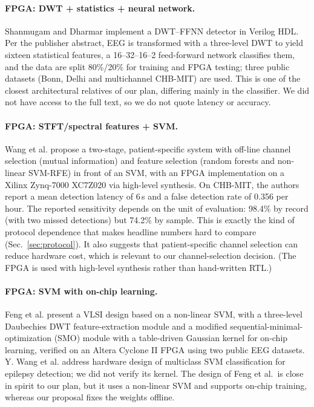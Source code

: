 \documentclass[10pt,twocolumn,letterpaper]{article}
\begin{document}
\paragraph{FPGA: DWT + statistics + neural network.} Shanmugam and
Dharmar \cite{shanmugam2025ffnn} implement a DWT--FFNN detector in
Verilog HDL. Per the publisher abstract, EEG is transformed with a
three-level DWT to yield sixteen statistical features, a 16--32--16--2
feed-forward network classifies them, and the data are split 80\%/20\%
for training and FPGA testing; three public datasets (Bonn, Delhi and
multichannel CHB-MIT) are used. This is one of the closest architectural
relatives of our plan, differing mainly in the classifier. We did not
have access to the full text, so we do not quote latency or accuracy.

\paragraph{FPGA: STFT/spectral features + SVM.} Wang et al.
\cite{wang2017integrating} propose a two-stage, patient-specific system
with off-line channel selection (mutual information) and feature
selection (random forests and non-linear SVM-RFE) in front of an SVM,
with an FPGA implementation on a Xilinx Zynq-7000 XC7Z020 via
high-level synthesis. On CHB-MIT, the authors report a mean detection
latency of 6\,s and a false detection rate of 0.356 per hour. The
reported sensitivity depends on the unit of evaluation: 98.4\% by record
(with two missed detections) but 74.2\% by sample. This is exactly the
kind of protocol dependence that makes headline numbers hard to compare
(Sec.~\ref{sec:protocol}). It also suggests that patient-specific
channel selection can reduce hardware cost, which is relevant to our
channel-selection decision. (The FPGA is used with high-level synthesis
rather than hand-written RTL.)

\paragraph{FPGA: SVM with on-chip learning.} Feng et al.
\cite{feng2018vlsi} present a VLSI design based on a non-linear SVM,
with a three-level Daubechies DWT feature-extraction module and a
modified sequential-minimal-optimization (SMO) module with a
table-driven Gaussian kernel for on-chip learning, verified on an Altera
Cyclone II FPGA using two public EEG datasets. Y. Wang et al.
\cite{wang2018hardware} address hardware design of multiclass SVM
classification for epilepsy detection; we did not verify its kernel. The
design of Feng et al.\ is close in spirit to our plan, but it uses a
non-linear SVM and supports on-chip training, whereas our proposal
fixes the weights offline.
\end{document}
